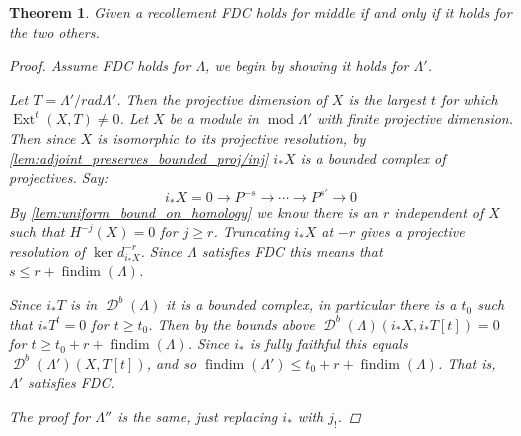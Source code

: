 \documentclass[11pt, a4paper, english]{article}
\newtheorem{theorem}{Theorem}[section]
\theoremstyle{definition}
\DeclareMathOperator{\Ext}{Ext}
\DeclareMathOperator{\findim}{findim}
\def\mod{\operatorname{mod}}
\DeclareMathOperator{\D}{\mathcal{D}}
\begin{document}
\begin{theorem}\cite[3.3]{Hap93}
	Given a recollement FDC holds for middle if and only if it holds for the two others.
	\begin{proof}
		Assume FDC holds for $\Lambda$, we begin by showing it holds for $\Lambda'$.
		
		Let $T = \Lambda' / rad\Lambda'$. Then the projective dimension of $X$ is the largest $t$ for which $\Ext^t(X, T) \neq 0$. Let $X$ be a module in $\mod \Lambda'$ with finite projective dimension. Then since $X$ is isomorphic to its projective resolution, by \cref{lem:adjoint_preserves_bounded_proj/inj} $i_*X$ is a bounded complex of projectives. Say:
		$$i_*X = 0 \to P^{-s} \to \cdots \to P^{s'} \to 0$$
		By \cref{lem:uniform_bound_on_homology} we know there is an $r$ independent of $X$ such that $H^{-j}(X)=0$ for $j \geq r$. Truncating $i_*X$ at $-r$ gives a projective resolution of $\ker d^{-r}_{i_*X}$. Since $\Lambda$ satisfies FDC this means that $s \leq r + \findim(\Lambda)$.
		
		Since $i_*T$ is in $\D^b(\Lambda)$ it is a bounded complex, in particular there is a $t_0$ such that $i_*T^{t}=0$ for $t \geq t_0$. Then by the bounds above $\D^b(\Lambda)(i_*X, i_*T[t]) = 0$ for $t \geq t_0 + r + \findim(\Lambda)$. Since $i_*$ is fully faithful this equals $\D^b(\Lambda')(X, T[t])$, and so $\findim(\Lambda') \leq t_0 + r + \findim(\Lambda)$. That is, $\Lambda'$ satisfies FDC.
		
		The proof for $\Lambda''$ is the same, just replacing $i_*$ with $j_!$.
		

\end{proof}
\end{theorem}
\end{document}
